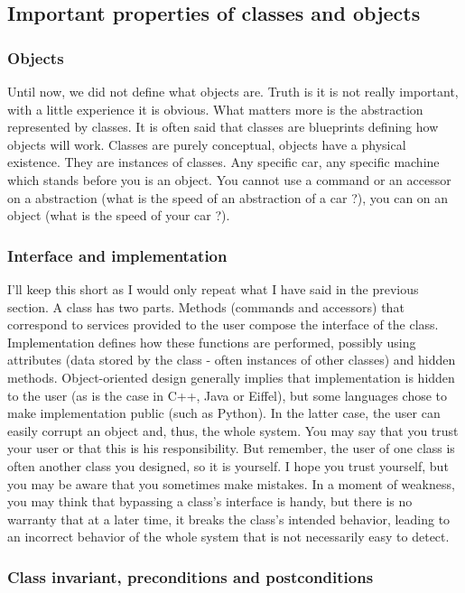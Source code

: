 \documentclass[12pt]{article}
\begin{document}
\subsection{Important properties of classes and objects}

\subsubsection{Objects}

Until now, we did not define what objects are. Truth is it is not really important, with a little experience it is obvious. What matters more is the abstraction represented by classes. It is often said that classes are blueprints defining how objects will work. Classes are purely conceptual, objects have a physical existence. They are instances of classes. Any specific car, any specific machine which stands before you is an object. You cannot use a command or an accessor on a abstraction (what is the speed of an abstraction of a car ?), you can on an object (what is the speed of your car ?).

\subsubsection{Interface and implementation}

I'll keep this short as I would only repeat what I have said in the previous section. A class has two parts. Methods (commands and accessors) that correspond to services provided to the user compose the interface of the class. Implementation defines how these functions are performed, possibly using attributes (data stored by the class - often instances of other classes) and hidden methods. Object-oriented design generally implies that implementation is hidden to the user (as is the case in C++, Java or Eiffel), but some languages chose to make implementation public (such as Python). In the latter case, the user can easily corrupt an object and, thus, the whole system. You may say that you trust your user or that this is his responsibility. But remember, the user of one class is often another class you designed, so it is yourself. I hope you trust yourself, but you may be aware that you sometimes make mistakes. In a moment of weakness, you may think that bypassing a class's interface is handy, but there is no warranty that at a later time, it breaks the class's intended behavior, leading to an incorrect behavior of the whole system that is not necessarily easy to detect.

\subsubsection{Class invariant, preconditions and postconditions}
\end{document}

